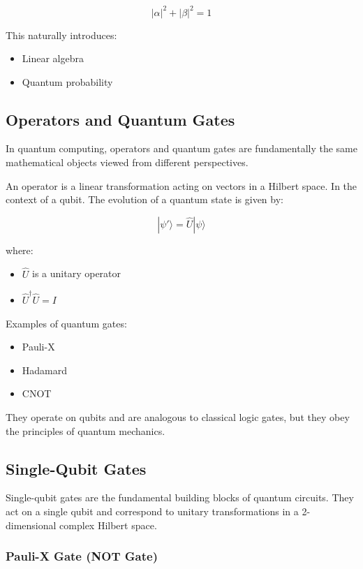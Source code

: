 \begin{equation}
|\alpha|^2 + |\beta|^2 = 1
\end{equation}

This naturally introduces:
\begin{itemize}
\item Linear algebra
\item Quantum probability
\end{itemize}

\subsection{Operators and Quantum Gates}

In quantum computing, operators and quantum gates are fundamentally the same 
mathematical objects viewed from different perspectives.

An operator is a linear transformation acting on vectors in a 
Hilbert space. In the context of a qubit. The evolution of a quantum state is given by:

\begin{equation}
|\psi'\rangle = \hat{U} |\psi\rangle
\end{equation}

where:
\begin{itemize}
\item $\hat{U}$ is a unitary operator
\item $\hat{U}^\dagger \hat{U} = I$
\end{itemize}

Examples of quantum gates:
\begin{itemize}
\item Pauli-X
\item Hadamard
\item CNOT
\end{itemize}

They operate on qubits and are analogous to classical logic gates, but they obey 
the principles of quantum mechanics.

\subsection{Single-Qubit Gates}

Single-qubit gates are the fundamental building blocks of quantum circuits. 
They act on a single qubit and correspond to unitary transformations in a 2-dimensional complex 
Hilbert space.

\subsubsection{Pauli-X Gate (NOT Gate)}

